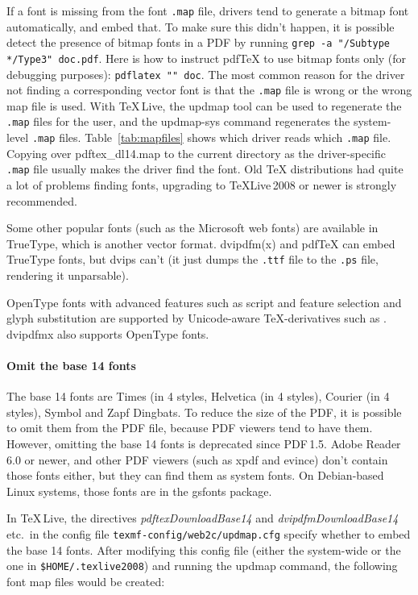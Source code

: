 \documentclass{ltugproc}
\def\cmd{\textsf}
\def\pkg{\textsf}
\begin{document}
If a font is missing from the font \texttt{.map} file, drivers tend to
generate a bitmap font automatically, and embed that. To make sure this
didn't happen, it is possible detect the presence of bitmap fonts in a PDF
by running \texttt{grep -a "/Subtype */Type3" doc.pdf}. Here is how to
instruct pdf\TeX{} to use bitmap fonts only (for debugging purposes):
\texttt{pdflatex "\string\pdfmapfile{}\string" doc}.
The most common
reason for the driver not finding a corresponding vector font is that the
\texttt{.map} file is wrong or the wrong map file is used. With
\TeX{}\,Live, the \cmd{updmap} tool can be used to regenerate the
\texttt{.map} files for the user, and the \cmd{updmap-sys} command
regenerates the system-level \texttt{.map} files. Table~\ref{tab:mapfiles}
shows which driver reads which \texttt{.map} file. Copying over
\pkg{pdftex\_dl14.map} to the current directory as the driver-specific
\texttt{.map} file
usually makes the driver find the font. Old \TeX{} distributions had quite
a lot of problems finding fonts, upgrading to \TeX{}Live\,2008 or newer is
strongly recommended.

Some other popular fonts (such as the Microsoft web fonts) are available in
TrueType, which is another vector format. \cmd{dvipdfm(x)} and pdf\TeX{} can
embed TrueType fonts, but \cmd{dvips} can't (it just dumps the
\texttt{.ttf} file to the \texttt{.ps} file, rendering it unparsable).

OpenType fonts with advanced features such as script and feature selection
and glyph substitution are supported by Unicode-aware \TeX{}-derivatives
such as \XeTeX{}. \cmd{dvipdfmx} also supports OpenType fonts.

\paragraph{Omit the base 14 fonts} The base 14 fonts are Times (in 4 styles,
Helvetica (in 4 styles), Courier (in 4 styles), Symbol and Zapf Dingbats.
To reduce the size of the PDF, it is possible to omit them from the
PDF file, because PDF viewers tend to have them. However, omitting the base 14
fonts is deprecated since PDF\,1.5. Adobe Reader 6.0 or newer,
and other PDF viewers (such as \cmd{xpdf} and \cmd{evince}) don't contain
those fonts either, but they can find them as system fonts. On Debian-based
Linux systems, those fonts are in the \pkg{gsfonts} package.

In \TeX\,Live, the directives \emph{pdftexDownloadBase14} and
\emph{dvipdfmDownloadBase14} etc.\ in the config file
\texttt{texmf-config/web2c/updmap.cfg} specify whether to embed the base 14
fonts. After modifying this config file (either the system-wide or the one in
\texttt{\$HOME/.texlive2008}) and running the \cmd{updmap} command, the
following font map files would be created:
\end{document}

